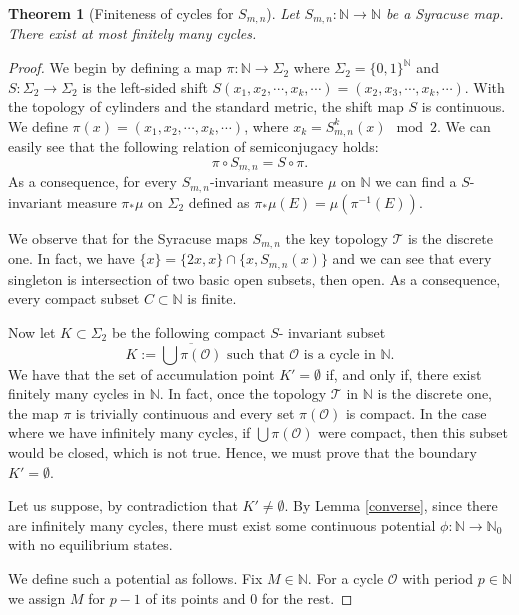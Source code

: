 \documentclass[12 pt]{amsart}
\newtheorem{theorem}{Theorem}
\theoremstyle{definition}
\begin{document}
\begin{theorem}[Finiteness of cycles for $S_{m,n}$] \label{finite_Syracuse}
	Let $S_{m,n} : \mathbb{N} \to \mathbb{N}$ be a Syracuse map. There exist at most finitely many cycles.
\end{theorem}
\begin{proof}
	We begin by defining a map $\pi : \mathbb{N} \to \Sigma_{2}$ where $\Sigma_{2} = \{0,1\}^{\mathbb{N}}$ and $S : \Sigma_{2} \to \Sigma_{2}$ is the left-sided shift $S(x_{1}, x_{2}, \cdots, x_{k},\cdots) =  (x_{2}, x_{3}, \cdots, x_{k},\cdots)$. With the topology of cylinders and the standard metric, the shift map $S$ is continuous. We define $\pi(x) = (x_{1}, x_{2}, \cdots, x_{k},\cdots)$, where $x_{k} = S_{m,n}^{k}(x) \mod 2$. We can easily see that the following relation of semiconjugacy holds:
	\[
	\pi \circ S_{m,n} = S \circ \pi.
	\]
	As a consequence, for every $S_{m,n}$-invariant measure $\mu$ on $\mathbb{N}$ we can find a $S$-invariant measure $\pi_{*}\mu$ on $\Sigma_{2}$ defined as $\pi_{*}\mu(E) = \mu(\pi^{-1}(E))$.
	
	We observe that for the Syracuse maps $S_{m,n}$ the key topology $\mathcal{T}$ is the discrete one. In fact, we have $\{x\} = \{2x, x\} \cap \{x, S_{m,n}(x)\}$ and we can see that every singleton is intersection of two basic open subsets, then open. As a consequence, every compact subset $C \subset \mathbb{N}$ is finite.
	
	Now let $K \subset \Sigma_{2}$ be the following compact $S$- invariant subset
	\[
	K := \overline{\bigcup \pi(\mathcal{O})} \,\, \text{such that} \,\, \mathcal{O} \,\, \text{is a cycle in} \,\, \mathbb{N}. 
	\]
	We have that the set of accumulation point $K' = \emptyset$ if, and only if, there exist finitely many cycles in $\mathbb{N}$. In fact, once the topology $\mathcal{T}$ in $\mathbb{N}$ is the discrete one, the map $\pi$ is trivially continuous and every set $\pi(\mathcal{O})$ is compact. In the case where we have infinitely many cycles, if $\bigcup \pi(\mathcal{O})$ were compact, then this subset would be closed, which is not true. Hence, we must prove that the boundary $K' = \emptyset$.
	
	Let us suppose, by contradiction that $K' \neq \emptyset$. By Lemma \ref{converse}, since there are infinitely many cycles, there must exist some continuous potential $\phi : \mathbb{N} \to \mathbb{N}_{0}$ with no equilibrium states. 
	
	We define such a potential as follows. Fix $M \in \mathbb{N}$. For a cycle $\mathcal{O}$ with period $p \in \mathbb{N}$ we assign $M$ for $p - 1$ of its points and $0$ for the rest. 
	

\end{proof}
\end{document}
